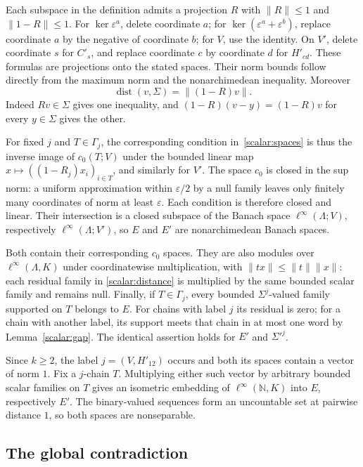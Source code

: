 \documentclass[11pt]{amsart}
\theoremstyle{definition}
\theoremstyle{remark}
\numberwithin{equation}{section}
\newcommand{\N}{\mathbb N}
\newcommand{\linf}{\ell^\infty}
\newcommand{\norm}[1]{\lVert #1\rVert}
\begin{document}
Each subspace in the definition admits a projection $R$ with $\norm R\le1$ and $\norm{1-R}\le1$.
For $\ker\varepsilon^a$, delete coordinate $a$; for $\ker(\varepsilon^a+\varepsilon^b)$, replace coordinate
$a$ by the negative of coordinate $b$; for $V$, use the identity. On $V'$, delete coordinate $s$ for
$C'_s$, and replace coordinate $c$ by coordinate $d$ for $H'_{cd}$. These formulas are projections onto
the stated spaces. Their norm bounds follow directly from the maximum norm and the nonarchimedean
inequality. Moreover
\begin{equation}\label{scalar:distance}
 \operatorname{dist}(v,\Sigma)=\norm{(1-R)v}.
\end{equation}
Indeed $Rv\in\Sigma$ gives one inequality, and $(1-R)(v-y)=(1-R)v$ for every $y\in\Sigma$ gives the other.

For fixed $j$ and $T\in\Gamma_j$, the corresponding condition in~\eqref{scalar:spaces} is thus the inverse
image of $c_0(T;V)$ under the bounded linear map $x\mapsto((1-R_j)x_i)_{i\in T}$, and similarly for $V'$.
The space $c_0$ is closed in the sup norm: a uniform approximation within $\varepsilon/2$ by a null family
leaves only finitely many coordinates of norm at least $\varepsilon$. Each condition is therefore closed
and linear. Their intersection is a closed subspace of the Banach space $\linf(\Lambda;V)$, respectively
$\linf(\Lambda;V')$, so $E$ and $E'$ are nonarchimedean Banach spaces.

Both contain their corresponding $c_0$ spaces. They are also modules over $\linf(\Lambda,K)$ under
coordinatewise multiplication, with $\norm{tx}\le\norm t\norm x$: each residual family in
\eqref{scalar:distance} is multiplied by the same bounded scalar family and remains null.
Finally, if $T\in\Gamma_j$, every bounded $\Sigma^j$\nobreakdash-valued family supported on $T$ belongs
to $E$. For chains with label $j$ its residual is zero; for a chain with another label, its support meets
that chain in at most one word by Lemma~\ref{scalar:gap}. The identical assertion holds for $E'$ and
$\Sigma'^j$.

Since $k\ge2$, the label $j=(V,H'_{12})$ occurs and both its spaces contain a vector of norm $1$.
Fix a $j$-chain $T$. Multiplying either such vector by arbitrary bounded scalar families on $T$ gives
an isometric embedding of $\linf(\N,K)$ into $E$, respectively $E'$. The binary-valued sequences form
an uncountable set at pairwise distance $1$, so both spaces are nonseparable.

\subsection{The global contradiction}
\end{document}
